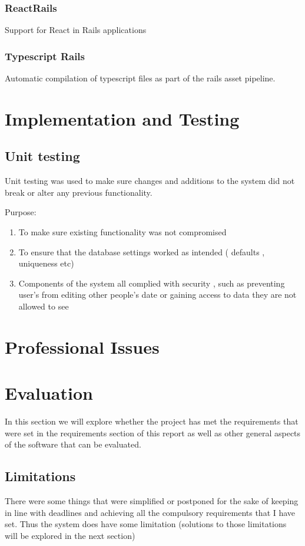 \documentclass[12pt]{article}
\begin{document}
\subsubsection{ReactRails}
Support for React in Rails applications

\subsubsection{Typescript Rails}
Automatic compilation of typescript files as part of the rails asset pipeline.


\section{Implementation and Testing}

\subsection{Unit testing}
Unit testing was used to make sure changes and additions to the system did not break or alter any previous functionality.

Purpose:
\begin{enumerate}
	\item To make sure existing functionality was not compromised
	\item To ensure that the database settings worked as intended ( defaults , uniqueness etc)
	\item Components of the system all complied with security , such as preventing user's from editing other people's date or gaining access to data they are not allowed to see
\end{enumerate}


\section{Professional Issues}

\section{Evaluation}
In this section we will explore whether the project has met the requirements that were set in the requirements section of this report as well as other general aspects of the software that can be evaluated.

\subsection{Limitations}
There were some things that were simplified or postponed for the sake of keeping in line with deadlines and achieving all the compulsory requirements that I have set. Thus the system does have some limitation (solutions to those limitations will be explored in the next section)
\end{document}
